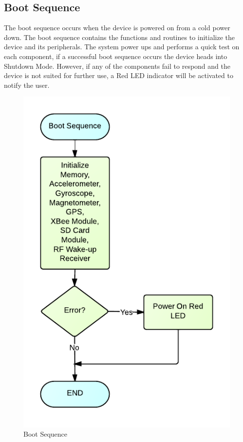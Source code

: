 \subsection{Boot Sequence}
The boot sequence occurs when the device is powered on from a cold power down. The boot sequence contains the functions and routines to initialize the device and its peripherals. The system power ups and performs a quick test on each component, if a successful boot sequence occurs the device heads into Shutdown Mode. However, if any of the components fail to respond and the device is not suited for further use, a Red LED indicator will be activated to notify the user.
\begin{figure}[H]
	\centering
	\includegraphics[scale=1.0]{img/BootSequenceFlowchart}
	\caption{Boot Sequence \label{fig:bootSequence}}
\end{figure}

